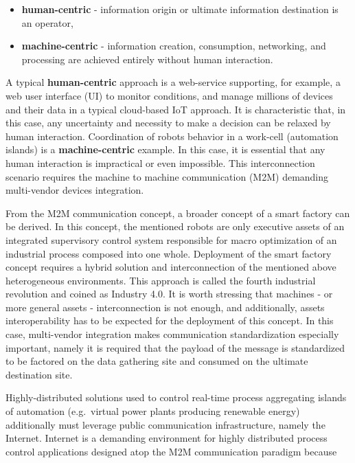 \documentclass{jacsart}
\begin{document}
\begin{itemize}
      \item \textbf{human-centric} - information origin or ultimate information destination is an operator,
      \item \textbf{machine-centric} - information creation, consumption, networking, and processing are achieved entirely without human interaction.
\end{itemize}

A typical \textbf{human-centric} approach is a web-service supporting, for example, a web user interface (UI) to monitor conditions, and manage millions of devices and their data in a typical cloud-based IoT approach. It is characteristic that, in this case, any uncertainty and necessity to make a decision can be relaxed by human interaction. Coordination of robots behavior in a work-cell (automation islands) is a \textbf{machine-centric} example. In this case, it is essential that any human interaction is impractical or even impossible. This interconnection scenario requires the machine to machine communication (M2M) demanding multi-vendor devices integration.

From the M2M communication concept, a broader concept of a smart factory can be derived. In this concept, the mentioned robots are only executive assets of an integrated supervisory control system responsible for macro optimization of an industrial process composed into one whole. Deployment of the smart factory concept requires a hybrid solution and interconnection of the mentioned above heterogeneous environments. This approach is called the fourth industrial revolution and coined as Industry 4.0. It is worth stressing that machines - or more general assets - interconnection is not enough, and additionally, assets interoperability has to be expected for the deployment of this concept. In this case, multi-vendor integration makes communication standardization especially important, namely it is required that the payload of the message is standardized to be factored on the data  gathering site and consumed on the ultimate destination site.

Highly-distributed solutions used to control real-time process aggregating islands of automation (e.g.~virtual power plants producing renewable energy) additionally must leverage public communication infrastructure, namely the Internet. Internet is a demanding environment for highly distributed process control applications designed atop the M2M communication paradigm because
\end{document}
